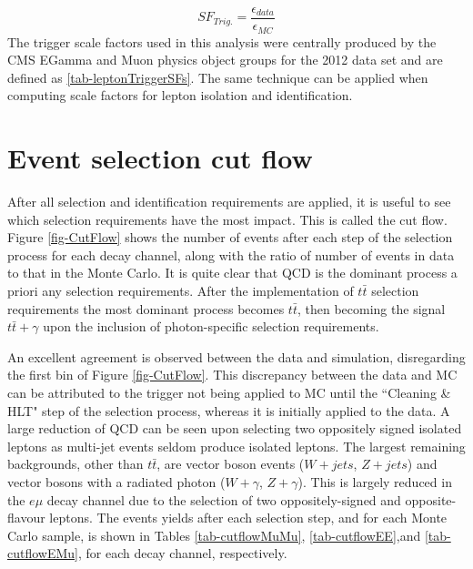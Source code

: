 \begin{description}
	\begin{equation}
	SF_{Trig.} = \frac{\epsilon_{data}}{\epsilon_{MC}}
	\end{equation}
	The trigger scale factors used in this analysis were centrally produced by the CMS EGamma and Muon physics object groups for the 2012 data set and are defined as \ref{tab-leptonTriggerSFs}. The same technique can be applied when computing scale factors for lepton isolation and identification.  
\end{description} 

\section{Event selection cut flow} \label{sec-cutflow}

After all selection and identification requirements are applied, it is useful to see which selection requirements have the most impact. This is called the cut flow. Figure \ref{fig-CutFlow} shows the number of events after each step of the selection process for each decay channel, along with the ratio of number of events in data to that in the Monte Carlo. It is quite clear that QCD is the dominant process a priori any selection requirements. After the implementation of $t\bar{t}$ selection requirements the most dominant process becomes $t\bar{t}$, then becoming the signal $t\bar{t}+\gamma$ upon the inclusion of photon-specific selection requirements. 

An excellent agreement is observed between the data and simulation, disregarding the first bin of Figure \ref{fig-CutFlow}. This discrepancy between the data and MC can be attributed to the trigger not being applied to MC until the ``Cleaning \& HLT" step of the selection process, whereas it is initially applied to the data. A large reduction of QCD can be seen upon selecting two oppositely signed isolated leptons as multi-jet events seldom produce isolated leptons. The largest remaining backgrounds, other than $t\bar{t}$, are vector boson events ($W+jets$, $Z+jets$) and vector bosons with a radiated photon ($W+\gamma$, $Z+\gamma$). This is largely reduced in the $e\mu$ decay channel due to the selection of two oppositely-signed and opposite-flavour leptons. The events yields after each selection step, and for each Monte Carlo sample, is shown in Tables \ref{tab-cutflowMuMu}, \ref{tab-cutflowEE},and \ref{tab-cutflowEMu}, for each decay channel, respectively. 

